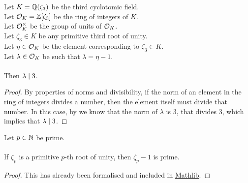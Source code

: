 \begin{lemma}
    \label{lmm:lambda_dvd_three}
    \leanok
    Let $K = \mathbb{Q}(\zeta_3)$ be the third cyclotomic field. \\
    Let $\mathcal{O}_K = \mathbb{Z}[\zeta_3]$ be the ring of integers of $K$. \\
    Let $\mathcal{O}^\times_K$ be the group of units of $\mathcal{O}_K$. \\
    Let $\zeta_3 \in K$ be any primitive third root of unity. \\
    Let $\eta \in \mathcal{O}_K$ be the element corresponding to $\zeta_3 \in K$. \\
    Let $\lambda \in \mathcal{O}_K$ be such that $\lambda = \eta -1$. \\\\
    Then $\lambda \mid 3$.
\end{lemma}
\begin{proof}
    \leanok
    By properties of norms and divisibility, if the norm of an element in the ring of integers
    divides a number, then the element itself must divide that number.
    In this case, by  we know that the norm of $\lambda$ is $3$, that divides $3$,
    which implies that $\lambda \mid 3$.
\end{proof}

\begin{theorem}
    \label{thm:zeta_sub_one_prime1}
    \leanok
    Let $p \in \mathbb{N}$ be prime. \\\\
    If $\zeta_p$ is a primitive $p$-th root of unity, then $\zeta_p - 1$ is prime.
\end{theorem}
\begin{proof}
    \leanok
    This has already been formalised and included in \href{https://pitmonticone.github.io/FLT3/docs/FLT3/Mathlib/NumberTheory/Cyclotomic/Rat.html#IsPrimitiveRoot.zeta_sub_one_prime'}{Mathlib}.
\end{proof}

